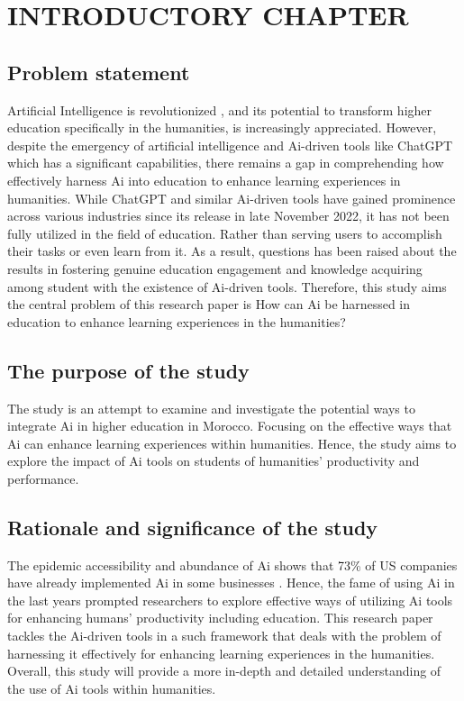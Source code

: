 \chapter{INTRODUCTORY CHAPTER}
\section{Problem statement}
\justifying
Artificial Intelligence is revolutionized , and its potential
to transform higher education specifically in the humanities, is increasingly
appreciated. However, despite the emergency of artificial intelligence and
Ai-driven tools like ChatGPT which has a significant capabilities,
there remains a gap in comprehending how effectively harness Ai into
education to enhance learning experiences in humanities. While ChatGPT
and similar Ai-driven tools have gained prominence across various
industries since its release in late November 2022, it has not been
fully utilized in the field of education. Rather than serving users
to accomplish their tasks or even learn from it. As a result, questions
has been raised about the results in fostering genuine education engagement
and knowledge acquiring among student with the existence of Ai-driven tools. Therefore, this study aims
the central problem of this research paper is How can Ai be harnessed
in education to enhance learning experiences in the humanities?
\section{The purpose of the study}
\justifying
The study is an attempt to examine and investigate the potential ways to integrate Ai in higher education in Morocco.
Focusing on the effective ways that Ai can enhance learning experiences within humanities. Hence, the study aims to
explore the impact of Ai tools on students of humanities' productivity and performance.
\section{Rationale and significance of the study}
\justifying
The epidemic accessibility and abundance of Ai shows that 73\% of US companies have already
implemented Ai in some businesses \citep{pricewaterhousecoopers_2024_2024} .
Hence, the fame of using Ai in the last years prompted researchers to explore effective ways of utilizing Ai tools
for enhancing humans' productivity including education. This research paper tackles the Ai-driven tools in a such framework that
deals with the problem of harnessing it effectively for enhancing learning experiences in the humanities.
Overall, this study will provide a more in-depth and detailed understanding of the use of Ai tools within humanities.

